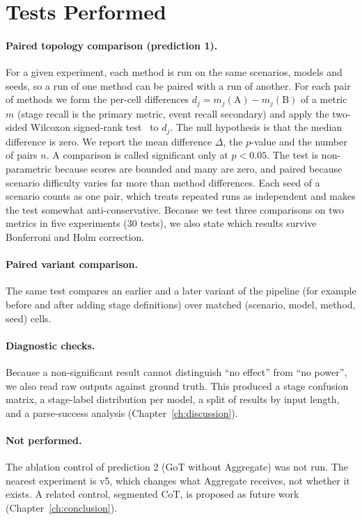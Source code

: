 \section{Tests Performed}
\label{sec:tests}
\paragraph{Paired topology comparison (prediction 1).} For a given experiment, each method is run on the same scenarios, models and seeds, so a run of one method can be paired with a run of another. For each pair of methods we form the per-cell differences $d_j=m_j(\text{A})-m_j(\text{B})$ of a metric $m$ (stage recall is the primary metric, event recall secondary) and apply the two-sided Wilcoxon signed-rank test~\cite{wilcoxon1945} to $d_j$. The null hypothesis is that the median difference is zero. We report the mean difference $\Delta$, the $p$-value and the number of pairs $n$. A comparison is called significant only at $p<0.05$. The test is non-parametric because scores are bounded and many are zero, and paired because scenario difficulty varies far more than method differences. Each seed of a scenario counts as one pair, which treats repeated runs as independent and makes the test somewhat anti-conservative. Because we test three comparisons on two metrics in five experiments (30 tests), we also state which results survive Bonferroni and Holm correction.

\paragraph{Paired variant comparison.} The same test compares an earlier and a later variant of the pipeline (for example before and after adding stage definitions) over matched (scenario, model, method, seed) cells.

\paragraph{Diagnostic checks.} Because a non-significant result cannot distinguish ``no effect'' from ``no power'', we also read raw outputs against ground truth. This produced a stage confusion matrix, a stage-label distribution per model, a split of results by input length, and a parse-success analysis (Chapter~\ref{ch:discussion}).

\paragraph{Not performed.} The ablation control of prediction 2 (GoT without Aggregate) was not run. The nearest experiment is v5, which changes what Aggregate receives, not whether it exists. A related control, segmented CoT, is proposed as future work (Chapter~\ref{ch:conclusion}).
